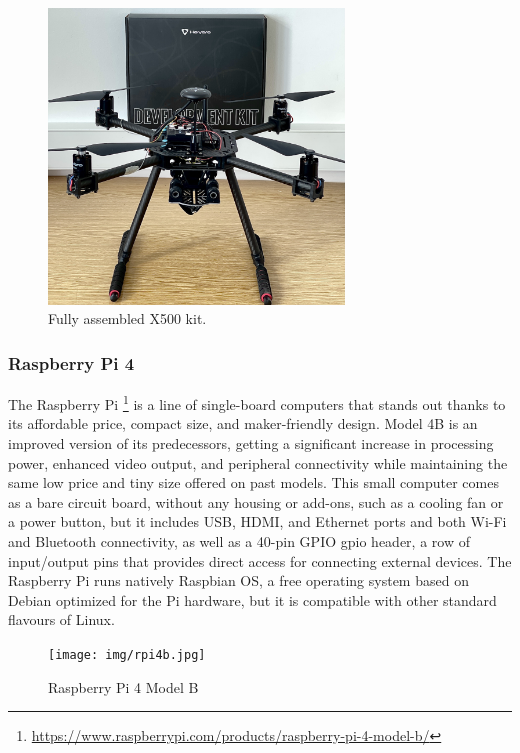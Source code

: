 \begin{figure}
  \centering
  \includegraphics[width=0.7\textwidth,keepaspectratio]{img/X500-assembled.jpg}
  \caption{Fully assembled X500 kit.}
  \label{fig:x500}
\end{figure}

\subsubsection{Raspberry Pi 4}
\label{subsec:rpi}
The Raspberry Pi \footnote{\url{https://www.raspberrypi.com/products/raspberry-pi-4-model-b/}} is a line of single-board computers that stands out thanks to its affordable price,
compact size, and maker-friendly design. Model 4B is an improved version of its predecessors,
getting a significant increase in processing power, enhanced video output, and peripheral connectivity
while maintaining the same low price and tiny size offered on past models.
This small computer comes as a bare circuit board,
without any housing or add-ons, such as a cooling fan or a power button,
but it includes USB, HDMI, and Ethernet ports and both Wi-Fi and Bluetooth connectivity,
as well as a 40-pin GPIO \gls{gpio} header, a row of input/output pins that provides direct access for connecting external devices.
The Raspberry Pi runs natively Raspbian OS, a free operating system based on Debian optimized for the Pi hardware, but it is compatible with other standard flavours of Linux.

\begin{figure}
  \centering
  \texttt{[image: img/rpi4b.jpg]}
  \caption{Raspberry Pi 4 Model B}
  \label{fig:rpi4b}
\end{figure}

